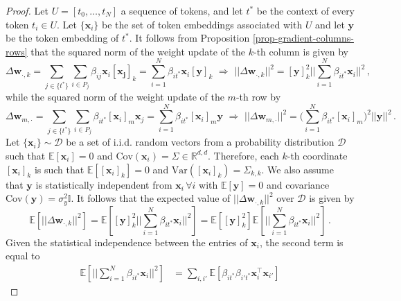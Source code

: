 \begin{proof}
%
%
Let $U = [t_0, \dots, t_N]$ a sequence of tokens, and let $t^*$ be the context of every token $t_i \in U$. 
%
Let $\{\bm{x}_i\}$ be the set of token embeddings associated with $U$ and let $\bm{y}$ be the token embedding of $t^*$.
%
It follows from Proposition \ref{prop-gradient-columns-rows} that the squared norm of the weight update of the $k$-th column is given by 
%
%
\begin{equation}
\Delta \bm{w}_{\cdot, k} = \sum_{j \in \{t^*\}}\sum_{i\in P_j} \beta_{ij}\bm{x}_i[\bm{x_j}]_k  = \sum_{i=1}^N \beta_{it^*}\bm{x}_i[\bm{y}]_k 
%
\,\,\Rightarrow \,\,
%
||\Delta \bm{w}_{\cdot, k}||^2 = [\bm{y}]^2_k || \sum_{i=1}^N \beta_{it^*}\bm{x}_i||^2 \,,
\end{equation}
%
while the squared norm of the weight update of the $m$-th row by
%
%
\begin{equation}
\Delta \bm{w}_{m, \cdot} = \sum_{j \in \{t^*\}}\sum_{i\in P_j} \beta_{it^*}[\bm{x}_i]_m\bm{x}_j= \sum_{i=1}^N \beta_{it^*}[\bm{x}_i]_m\bm{y} 
%
\,\,\Rightarrow \,\,
%
||\Delta \bm{w}_{m, \cdot}||^2 = \big(\sum_{i=1}^N\beta_{it^*}[\bm{x}_i]_m\big)^2 ||  \bm{y}||^2 \,.
\end{equation}
%
Let $\{\bm{x}_i\} \sim \mathcal{D}$ be a set of i.i.d. random vectors from a probability distribution $\mathcal{D}$ such that $\mathbb{E}[\bm{x}_i] = 0$ and $\text{Cov}(\bm{x}_i) = \Sigma \in \mathbb{R}^{d,d}$.
%
Therefore, each $k$-th coordinate $[\bm{x}_i]_k$ is such that  $\mathbb{E}[[\bm{x}_i]_k] = 0$ and $\text{Var}([\bm{x}_i]_k) = \Sigma_{k,k}$. 
%
We also assume that $\bm{y}$ is statistically independent from $\bm{x}_i \, \forall i$ with $\mathbb{E}[\bm{y}] = 0$ and covariance $\text{Cov}(\bm{y})  = \sigma_y^2\mathbb{I}$.
%
It follows that the expected value of $||\Delta \bm{w}_{\cdot, k}||^2$ over  $\mathcal{D}$ is given by
%
\begin{equation}
\mathbb{E}\left[ ||\Delta \bm{w}_{\cdot, k}||^2 \right] 
= 
\mathbb{E}\left[ [\bm{y}]^2_k ||\sum_{i=1}^N \beta_{it^*}\bm{x}_i||^2 \right]
= 
\mathbb{E}\left[ [\bm{y}]^2_k \right] \mathbb{E}\left[ || \sum_{i=1}^N \beta_{it^*}\bm{x}_i||^2 \right] \,.
\end{equation}
%
Given the statistical independence between the entries of $\bm{x}_i$, the second term is equal to
%
\begin{equation}
\begin{split}
\mathbb{E}\left[ || \sum_{i=1}^N \beta_{it^*}\bm{x}_i||^2 \right]
& = \sum_{i,i'}\mathbb{E}\left[ \beta_{it^*}\beta_{i't^*}\bm{x}^\top_{i}\bm{x}_{i'}\right]

\end{split}
\end{equation}
\end{proof}
